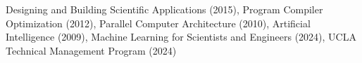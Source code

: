 Designing and Building Scientific Applications (2015), Program Compiler Optimization (2012), Parallel Computer Architecture (2010),  Artificial Intelligence (2009), Machine Learning for Scientists and Engineers (2024), UCLA Technical Management Program (2024)